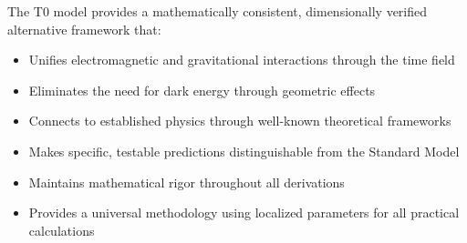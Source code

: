 \documentclass[12pt,a4paper]{article}
\begin{document}
	\begin{tcolorbox}[colback=green!5!white,colframe=green!75!black,title=T0 Model: A Unified Framework]
		The T0 model provides a mathematically consistent, dimensionally verified alternative framework that:
		\begin{itemize}
			\item Unifies electromagnetic and gravitational interactions through the time field
			\item Eliminates the need for dark energy through geometric effects
			\item Connects to established physics through well-known theoretical frameworks
			\item Makes specific, testable predictions distinguishable from the Standard Model
			\item Maintains mathematical rigor throughout all derivations
			\item Provides a universal methodology using localized parameters for all practical calculations
		\end{itemize}
	\end{tcolorbox}
	
	
	
\end{document}
